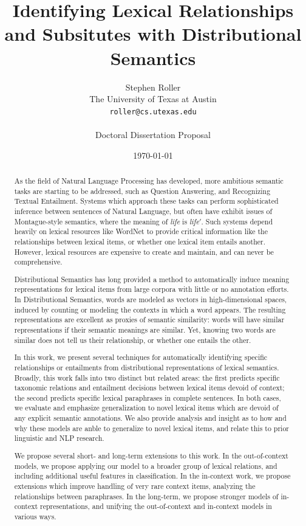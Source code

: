 \documentclass[letterpaper]{article}
\title{Identifying Lexical Relationships and Subsitutes with Distributional Semantics}
\author{Stephen Roller\\
The University of Texas at Austin\\
{\tt roller@cs.utexas.edu}\\
\\
Doctoral Dissertation Proposal}
\date{\today}
\begin{document}
\maketitle

\begin{abstract}
  As the field of Natural Language Processing has developed, more ambitious
  semantic tasks are starting to be addressed, such as Question Answering, and
  Recognizing Textual Entailment. Systems which approach these tasks can
  perform sophisticated inference between sentences of Natural Language, but
  often have exhibit issues of Montague-style semantics, where the meaning of
  {\em life} is {\em life$'$}. Such systems depend heavily on lexical resources
  like WordNet to provide critical information like the relationships between
  lexical items, or whether one lexical item entails another. However, lexical
  resources are expensive to create and maintain, and can never be
  comprehensive.

  Distributional Semantics has long provided a method to automatically induce
  meaning representations for lexical items from large corpora with little or
  no annotation efforts. In Distributional Semantics, words are modeled as
  vectors in high-dimensional spaces, induced by counting or modeling the
  contexts in which a word appears. The resulting representations are excellent
  as proxies of semantic similarity: words will have similar representations if
  their semantic meanings are similar. Yet, knowing two words are similar does
  not tell us their relationship, or whether one entails the other.

  In this work, we present several techniques for automatically identifying
  specific relationships or entailments from distributional representations of
  lexical semantics. Broadly, this work falls into two distinct but related
  areas: the first predicts specific taxonomic relations and entailment
  decisions between lexical items devoid of context;
  the second predicts specific lexical paraphrases in complete sentences. In
  both cases, we evaluate and emphasize generalization to novel lexical items
  which are devoid of any explicit semantic annotations.  We also provide
  analysis and insight as to how and why these models are anble to generalize
  to novel lexical items, and relate this to prior linguistic and NLP research.

  We propose several short- and long-term extensions to this work. In the
  out-of-context models, we propose applying our model to a broader group of
  lexical relations, and including additional useful features in
  classification.  In the in-context work, we propose extensions which improve
  handling of very rare context items, analyzing the relationships between
  paraphrases. In the long-term, we propose stronger models of in-context
  representations, and unifying the out-of-context and in-context models in
  various ways.

\end{abstract}
\end{document}

